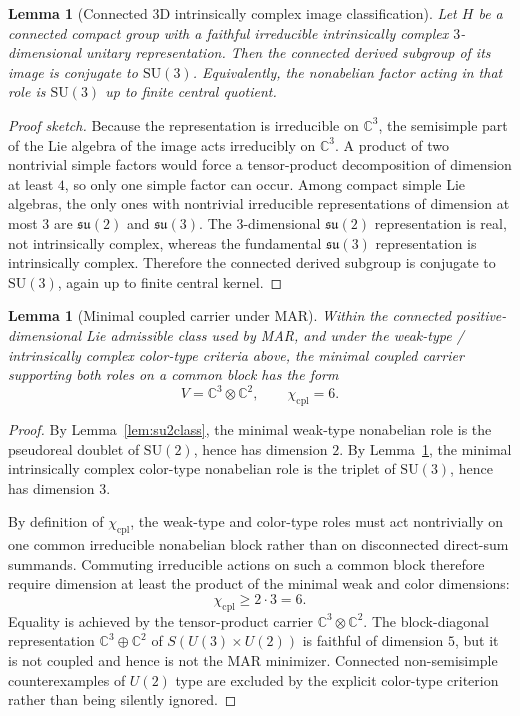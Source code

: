 \documentclass[11pt]{article}
\newtheorem{lemma}[theorem]{Lemma}
\newcommand{\SU}{\mathrm{SU}}
\begin{document}
\begin{lemma}[Connected 3D intrinsically complex image classification]\label{lem:su3class}
Let $H$ be a connected compact group with a faithful irreducible intrinsically complex $3$-dimensional unitary representation. Then the connected derived subgroup of its image is conjugate to $\SU(3)$. Equivalently, the nonabelian factor acting in that role is $\SU(3)$ up to finite central quotient.
\end{lemma}

\begin{proof}[Proof sketch]
Because the representation is irreducible on $\mathbb C^3$, the semisimple part of the Lie algebra of the image acts irreducibly on $\mathbb C^3$. A product of two nontrivial simple factors would force a tensor-product decomposition of dimension at least $4$, so only one simple factor can occur. Among compact simple Lie algebras, the only ones with nontrivial irreducible representations of dimension at most $3$ are $\mathfrak{su}(2)$ and $\mathfrak{su}(3)$. The $3$-dimensional $\mathfrak{su}(2)$ representation is real, not intrinsically complex, whereas the fundamental $\mathfrak{su}(3)$ representation is intrinsically complex. Therefore the connected derived subgroup is conjugate to $\SU(3)$, again up to finite central kernel.
\end{proof}

\begin{lemma}[Minimal coupled carrier under MAR]\label{lem:carrier}
Within the connected positive-dimensional Lie admissible class used by MAR, and under the weak-type / intrinsically complex color-type criteria above, the minimal coupled carrier supporting both roles on a common block has the form
\[
V=\mathbb C^3\otimes \mathbb C^2,
\qquad
\chi_{\mathrm{cpl}}=6.
\]
\end{lemma}

\begin{proof}
By Lemma~\ref{lem:su2class}, the minimal weak-type nonabelian role is the pseudoreal doublet of $\SU(2)$, hence has dimension $2$. By Lemma~\ref{lem:su3class}, the minimal intrinsically complex color-type nonabelian role is the triplet of $\SU(3)$, hence has dimension $3$.

By definition of $\chi_{\mathrm{cpl}}$, the weak-type and color-type roles must act nontrivially on one common irreducible nonabelian block rather than on disconnected direct-sum summands. Commuting irreducible actions on such a common block therefore require dimension at least the product of the minimal weak and color dimensions:
\[
\chi_{\mathrm{cpl}}\ge 2\cdot 3=6.
\]
Equality is achieved by the tensor-product carrier $\mathbb C^3\otimes\mathbb C^2$. The block-diagonal representation $\mathbb C^3\oplus \mathbb C^2$ of $S(U(3)\times U(2))$ is faithful of dimension $5$, but it is not coupled and hence is not the MAR minimizer. Connected non-semisimple counterexamples of $U(2)$ type are excluded by the explicit color-type criterion rather than being silently ignored.
\end{proof}
\end{document}
